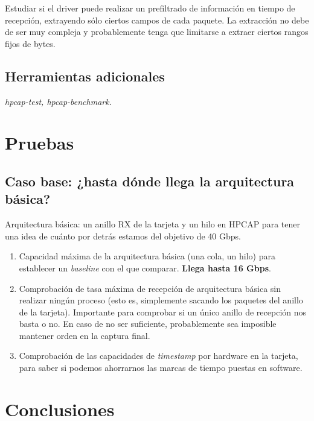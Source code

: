 \documentclass[twoside, draft]{epstfg}
\begin{document}
Estudiar si el driver puede realizar un prefiltrado de información en tiempo de recepción, extrayendo sólo ciertos campos de cada paquete. La extracción no debe de ser muy compleja y probablemente tenga que limitarse a extraer ciertos rangos fijos de bytes.

\lipsum[2-20]

\section{Herramientas adicionales}

\textit{hpcap-test, hpcap-benchmark}.

\chapter{Pruebas}

\section{Caso base: ¿hasta dónde llega la arquitectura básica?}

Arquitectura básica: un anillo RX de la tarjeta y un hilo en HPCAP para tener una idea de cuánto por detrás estamos del objetivo de 40 Gbps.

\begin{enumerate}
\item Capacidad máxima de la arquitectura básica (una cola, un hilo) para establecer un \textit{baseline} con el que comparar. \textbf{Llega hasta 16 Gbps}.
\item Comprobación de tasa máxima de recepción de arquitectura básica sin realizar ningún proceso (esto es, simplemente sacando los paquetes del anillo de la tarjeta). Importante para comprobar si un único anillo de recepción nos basta o no. En caso de no ser suficiente, probablemente sea imposible mantener orden en la captura final.
\item Comprobación de las capacidades de \textit{timestamp} por hardware en la tarjeta, para saber si podemos ahorrarnos las marcas de tiempo puestas en software.
\end{enumerate}


\chapter{Conclusiones}

\appendix

\printnoidxglossaries
\cleardoublepage

\nocite{*}
{}

\cleardoublepage
\printindex
\end{document}
